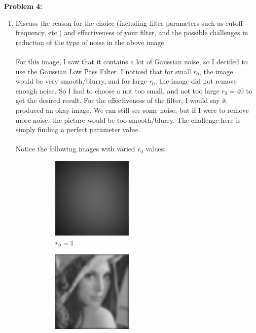 \documentclass[11pt]{article}
\newenvironment{problem}[1]{\textbf{Problem #1: }}{\newpage}
\begin{document}
\begin{problem}{4}
\begin{enumerate}[label = (\alph*)]
\begin{figure}[h!]
\begin{subfigure}[h!]{.4\textwidth}
					\caption{Resized to Original $f_{flt}$}
				\end{subfigure}
			\end{figure}
			\newpage
			\item Discuss the reason for the choice (including filter parameters such as cutoff frequency, etc.) and effectiveness of your filter, and the possible challenges in reduction of the type of noise in the above image.
			\\ \\
			For this image, I saw that it contains a lot of Gaussian noise, so I decided to use the Gaussian Low Pass Filter.  I noticed that for small $r_0$, the image would be very smooth/blurry, and for large $r_0$, the image did not remove enough noise.  So I had to choose a not too small, and not too large $r_0 = 40$ to get the desired result.  For the effectiveness of the filter, I would say it produced an okay image.  We can still see some noise, but if I were to remove more noise, the picture would be too smooth/blurry.  The challenge here is simply finding a perfect parameter value. 
			\\ \\
			Notice the following images with varied $r_0$ values:
			\\
			\begin{figure}[h!]
				\centering
				\begin{subfigure}{.3 \textwidth}
					\centering
					\includegraphics[height = 4cm]{Figures/Prob4/r01}
					\caption{$r_0 = 1$}
				\end{subfigure}
				\begin{subfigure}{.3 \textwidth}
					\centering
					\includegraphics[height = 4cm]{Figures/Prob4/r020}

\end{subfigure}
\end{figure}
\end{enumerate}
\end{problem}
\end{document}
